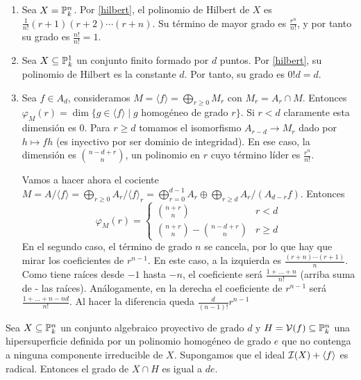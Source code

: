 \documentclass[ACGA.tex]{subfiles}
\begin{document}
\begin{ejs}

\begin{enumerate}
        \item Sea $X=\mathbb{P}^n_k$. Por \ref{hilbert}, el polinomio de Hilbert de $X$ es $\frac{1}{n!}(r+1)(r+2)\cdots(r+n)$. Su término de mayor grado es $\frac{r^n}{n!}$, y por tanto su grado es $\frac{n!}{n!}=1$.
\item Sea $X\subseteq\mathbb{P}^1_k$ un conjunto finito formado por $d$ puntos. Por \ref{hilbert}, su polinomio de Hilbert es la constante $d$. Por tanto, su grado es $0!d=d$.

	\item Sea $f\in A_d$, consideramos $M=\langle f\rangle=\bigoplus_{r\geq 0}M_r$ con $M_r=A_r\cap M$. Entonces $\varphi_M(r)=\dim\{g\in\langle f\rangle\mid g$ homogéneo de grado $r\}$. Si $r<d$ claramente esta dimensión es 0. Para $r\geq d$ tomamos el isomorfismo $A_{r-d}\to M_r$ dado por $h\mapsto fh$ (es inyectivo por ser dominio de integridad). En ese caso, la dimensión es $\binom{n-d+r}{n}$, un polinomio en $r$ cuyo término líder es $\frac{r^n}{n!}$.

Vamos a hacer ahora el cociente $M=A/\langle f\rangle=\bigoplus_{r\geq 0} A_r/\langle f\rangle_r=\bigoplus_{r=0}^{d-1}A_r\oplus\bigoplus_{r\geq d}A_r/(A_{d-r}f)$.
Entonces 
\[
\varphi_M(r)=\begin{cases}
\binom{n+r}{n} & r<d\\
\binom{n+r}{n}-\binom{n-d+r}{n} & r\geq d
\end{cases}
\] 
En el segundo caso, el término de grado $n$ se cancela, por lo que hay que mirar los coeficientes de $r^{n-1}$. En este caso, a la izquierda es $\frac{(r+n)\cdots (r+1)}{n}$. Como tiene raíces desde $-1$ hasta $-n$, el coeficiente será $\frac{1+\dots+n}{n!}$ (arriba suma de - las raíces). Análogamente, en la derecha el coeficiente de $r^{n-1}$ será $\frac{1+\dots+n-nd}{n!}$. Al hacer la diferencia queda $\frac{d}{(n-1)!}r^{n-1}$
\end{enumerate}

\end{ejs}

\begin{prop}\label{gradointerseccion}
 Sea $X\subseteq\mathbb{P}^n_k$ un conjunto algebraico proyectivo de grado $d$ y $H=\mathcal{V}(f)\subseteq\mathbb{P}^n_k$ una hipersuperficie definida por un polinomio homogéneo de grado $e$ que no contenga a ninguna componente irreducible de $X$. Supongamos que el ideal $\mathcal{I}(X)+\langle f\rangle$ es radical. Entonces el grado de $X\cap H$ es igual a $de$.
\end{prop}
\end{document}
